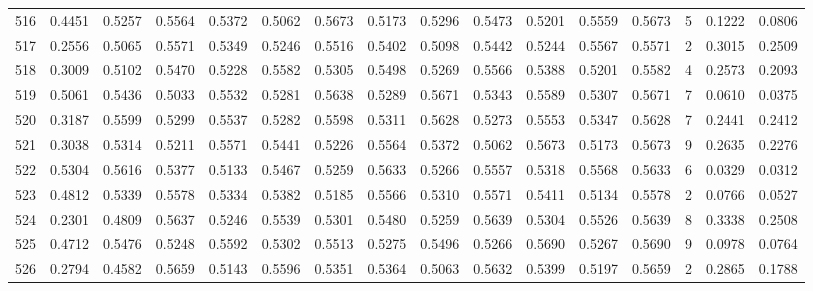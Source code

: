 \begin{tabular}{lrrrrrrrrrrrrrrr}
516 &      0.4451 &  0.5257 &  0.5564 &  0.5372 &  0.5062 &  0.5673 &  0.5173 &  0.5296 &  0.5473 &  0.5201 &   0.5559 &     0.5673 &      5 &                    0.1222 &                     0.0806 \\
517 &      0.2556 &  0.5065 &  0.5571 &  0.5349 &  0.5246 &  0.5516 &  0.5402 &  0.5098 &  0.5442 &  0.5244 &   0.5567 &     0.5571 &      2 &                    0.3015 &                     0.2509 \\
518 &      0.3009 &  0.5102 &  0.5470 &  0.5228 &  0.5582 &  0.5305 &  0.5498 &  0.5269 &  0.5566 &  0.5388 &   0.5201 &     0.5582 &      4 &                    0.2573 &                     0.2093 \\
519 &      0.5061 &  0.5436 &  0.5033 &  0.5532 &  0.5281 &  0.5638 &  0.5289 &  0.5671 &  0.5343 &  0.5589 &   0.5307 &     0.5671 &      7 &                    0.0610 &                     0.0375 \\
520 &      0.3187 &  0.5599 &  0.5299 &  0.5537 &  0.5282 &  0.5598 &  0.5311 &  0.5628 &  0.5273 &  0.5553 &   0.5347 &     0.5628 &      7 &                    0.2441 &                     0.2412 \\
521 &      0.3038 &  0.5314 &  0.5211 &  0.5571 &  0.5441 &  0.5226 &  0.5564 &  0.5372 &  0.5062 &  0.5673 &   0.5173 &     0.5673 &      9 &                    0.2635 &                     0.2276 \\
522 &      0.5304 &  0.5616 &  0.5377 &  0.5133 &  0.5467 &  0.5259 &  0.5633 &  0.5266 &  0.5557 &  0.5318 &   0.5568 &     0.5633 &      6 &                    0.0329 &                     0.0312 \\
523 &      0.4812 &  0.5339 &  0.5578 &  0.5334 &  0.5382 &  0.5185 &  0.5566 &  0.5310 &  0.5571 &  0.5411 &   0.5134 &     0.5578 &      2 &                    0.0766 &                     0.0527 \\
524 &      0.2301 &  0.4809 &  0.5637 &  0.5246 &  0.5539 &  0.5301 &  0.5480 &  0.5259 &  0.5639 &  0.5304 &   0.5526 &     0.5639 &      8 &                    0.3338 &                     0.2508 \\
525 &      0.4712 &  0.5476 &  0.5248 &  0.5592 &  0.5302 &  0.5513 &  0.5275 &  0.5496 &  0.5266 &  0.5690 &   0.5267 &     0.5690 &      9 &                    0.0978 &                     0.0764 \\
526 &      0.2794 &  0.4582 &  0.5659 &  0.5143 &  0.5596 &  0.5351 &  0.5364 &  0.5063 &  0.5632 &  0.5399 &   0.5197 &     0.5659 &      2 &                    0.2865 &                     0.1788 \\

\end{tabular}
